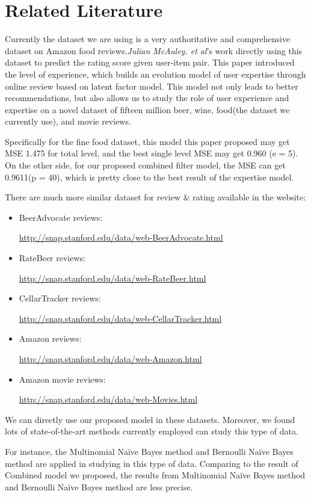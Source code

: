 \documentclass[sigconf]{acmart}
\begin{document}
\section{Related Literature}
Currently the dataset we are using is a very authoritative and comprehensive dataset on Amazon food reviews.\emph{Julian McAuley. et al}'s work \cite{mcauley2013amateurs} directly using this dataset to predict the rating score given user-item pair. This paper introduced the level of experience, which builds an evolution model of user expertise through online review based on latent factor model. This model not only leads to better recommendations, but also allows us to study the role of user experience and expertise on a novel dataset of fifteen million beer, wine, food(the dataset we currently use), and movie reviews. 

Specifically for the fine food dataset, this model this paper proposed may get MSE 1.475  for total level, and the best single level MSE may get 0.960 (e = 5). On the other side, for our proposed combined filter model, the MSE can get 0.9611(p = 40), which is pretty close to the best result of the expertise model.

There are much more similar dataset for review & rating available in the website:  
\begin{itemize}
    \item BeerAdvocate reviews:
    
    \url{http://snap.stanford.edu/data/web-BeerAdvocate.html}
    \item RateBeer reviews:
    
    \url{http://snap.stanford.edu/data/web-RateBeer.html}
    \item CellarTracker reviews:
    
    \url{http://snap.stanford.edu/data/web-CellarTracker.html}
    \item Amazon reviews:
    
    \url{http://snap.stanford.edu/data/web-Amazon.html}
    \item Amazon movie reviews:
    
    \url{http://snap.stanford.edu/data/web-Movies.html}
\end{itemize}

We can directly use our proposed model in these datasets. Moreover, we found lots of state-of-the-art methods currently employed can study this type of data.

For instance, the Multinomial Naïve Bayes method\cite{panda2010discriminative} and Bernoulli Naïve Bayes method \cite{kim2006some} are applied in studying in this type of data. Comparing to the result of Combined model we proposed, the results from Multinomial Naïve Bayes method and Bernoulli Naïve Bayes method are less precise. 
\end{document}
